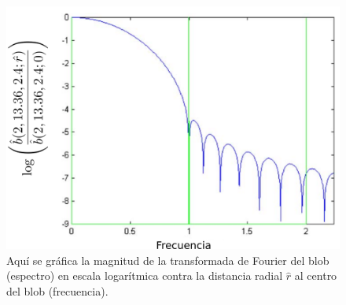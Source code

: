 \begin{figure}[htp]
 \centering
  \includegraphics[scale=0.9]{img/cap02/blobSpectre}
  \caption[Espectro del blob en escala logarítmica]{Aquí se gráfica la magnitud de la transformada de Fourier del blob (espectro) en escala logarítmica contra la distancia radial $\hat{r}$ al centro del blob (frecuencia).}
  \label{fig:blobSpectre}
\end{figure}
